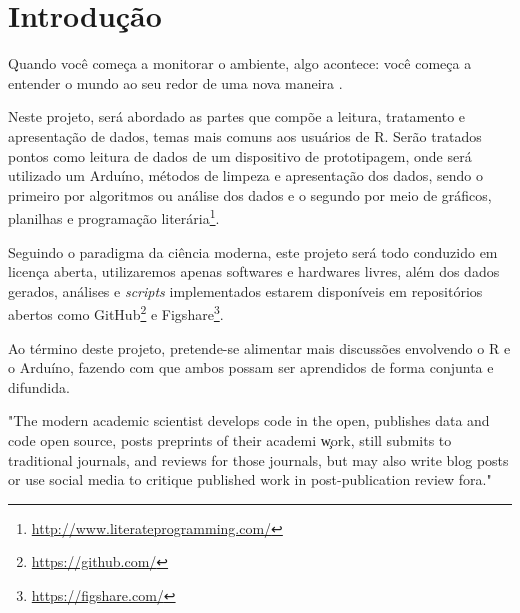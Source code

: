 \section*{Introdução}



Quando você começa a monitorar o ambiente, algo acontece: você começa a entender o mundo ao seu redor de uma nova maneira \cite[~p.1, tradução nossa]{Gertz2012}. 

Neste projeto, será abordado as partes que compõe a leitura, tratamento e apresentação de dados, temas mais comuns aos usuários de R. Serão tratados pontos como leitura de dados de um dispositivo de prototipagem, onde será utilizado um Arduíno, métodos de limpeza e apresentação dos dados, sendo o primeiro por algoritmos ou análise dos dados e o segundo por meio de gráficos, planilhas e programação literária\footnote{\url{http://www.literateprogramming.com/}}.

Seguindo o paradigma da ciência moderna, este projeto será todo conduzido em licença aberta, utilizaremos apenas softwares e hardwares livres, além dos dados gerados, análises e \textit{scripts} implementados estarem disponíveis em repositórios abertos como GitHub\footnote{\url{https://github.com/}} e Figshare\footnote{\url{https://figshare.com/}}.

Ao término deste projeto, pretende-se alimentar mais discussões envolvendo o R e o Arduíno, fazendo com que ambos possam ser aprendidos de forma conjunta e difundida. 

\begin{citacao}[english]
  "The modern academic scientist develops code in the open, publishes data and code open source, posts preprints of their academi \c work, still submits to traditional journals, and reviews for those journals, but may also write blog posts or use social media to critique published work in post-publication review fora."\cite{Peng2015}
\end{citacao}

    